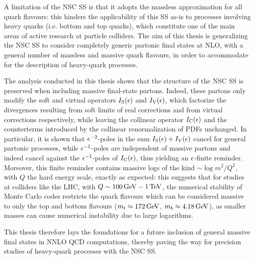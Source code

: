 A limitation of the NSC SS is that it adopts the massless approximation for all quark flavours: this hinders the applicability of this SS as-is to processes involving heavy quarks (i.e. bottom and top quarks), which constitute one of the main areas of active research at particle colliders. The aim of this thesis is generalizing the NSC SS to consider completely generic partonic final states at NLO, with a general number of massless and massive quark flavours, in order to accommodate for the description of heavy-quark processes.

The analysis conducted in this thesis shows that the structure of the NSC SS is preserved when including massive final-state partons. Indeed, these partons only modify the soft and virtual operators $ I_\text{S}(\epsilon) $ and $ I_\text{V}(\epsilon) $, which factorize the divergences resulting from soft limits of real corrections and from virtual corrections respectively, while leaving the collinear operator $ I_\text{C}(\epsilon) $ and the counterterms introduced by the collinear renormalization of PDFs unchanged. In particular, it is shown that $ \epsilon^{-2} $-poles in the sum $ I_\text{S}(\epsilon) + I_\text{V}(\epsilon) $ cancel for general partonic processes, while $ \epsilon^{-1} $-poles are independent of massive partons and indeed cancel against the $ \epsilon^{-1} $-poles of $ I_\text{C}(\epsilon) $, thus yielding an $ \epsilon $-finite reminder. Moreover, this finite reminder contains massive logs of the kind $ \sim \log m^2 / Q^2 $, with $ Q $ the hard energy scale, exactly as expected: this suggests that for studies at colliders like the LHC, with $ Q \sim 100\,\mathrm{GeV} - 1\,\mathrm{TeV} $, the numerical stability of Monte Carlo codes restricts the quark flavours which can be considered massive to only the top and bottom flavours ($ m_t \approx 172 \,\mathrm{GeV} $, $ m_b \approx 4.18 \,\mathrm{GeV} $), as smaller masses can cause numerical instability due to large logarithms.

This thesis therefore lays the foundations for a future inclusion of general massive final states in NNLO QCD computations, thereby paving the way for precision studies of heavy-quark processes with the NSC SS.










